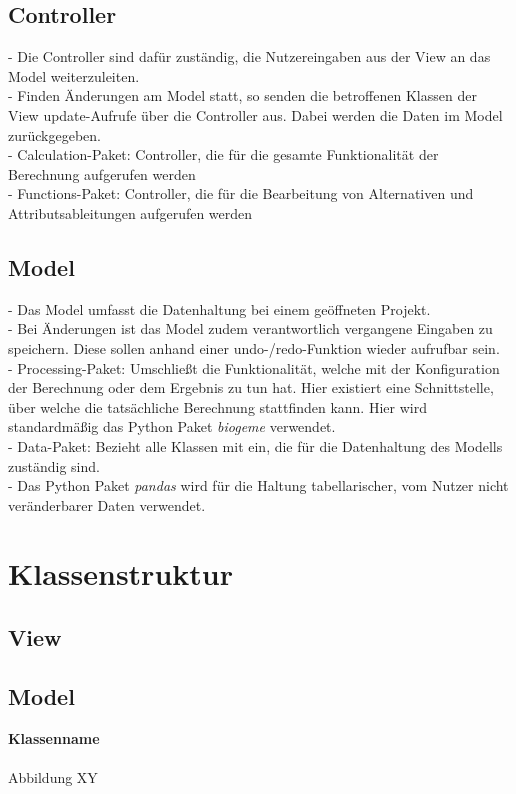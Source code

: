 \documentclass{article}
\begin{document}
\subsection{Controller}
- Die Controller sind dafür zuständig, die Nutzereingaben aus der View an das Model weiterzuleiten.\\
- Finden Änderungen am Model statt, so senden die betroffenen Klassen der View update-Aufrufe über die Controller aus. Dabei werden die Daten im Model zurückgegeben.\\
- Calculation-Paket: Controller, die für die gesamte Funktionalität der Berechnung aufgerufen werden\\
- Functions-Paket: Controller, die für die Bearbeitung von Alternativen und Attributsableitungen aufgerufen werden
\subsection{Model}
- Das Model umfasst die Datenhaltung bei einem geöffneten Projekt. \\
- Bei Änderungen ist das Model zudem verantwortlich vergangene Eingaben zu speichern. Diese sollen anhand einer undo-/redo-Funktion wieder aufrufbar sein.\\
- Processing-Paket: Umschließt die Funktionalität, welche mit der Konfiguration der Berechnung oder dem Ergebnis zu tun hat. Hier existiert eine Schnittstelle, über welche die tatsächliche Berechnung stattfinden kann. Hier wird standardmäßig das Python Paket \textit{biogeme} verwendet. \\
- Data-Paket: Bezieht alle Klassen mit ein, die für die Datenhaltung des Modells zuständig sind. \\
- Das Python Paket \textit{pandas} wird für die Haltung tabellarischer, vom Nutzer nicht veränderbarer Daten verwendet.

\newpage
\section{Klassenstruktur}
\subsection{View}

\newpage
\subsection{Model}

\textbf{\large{Klassenname}}\\\\
Abbildung XY
\end{document}
